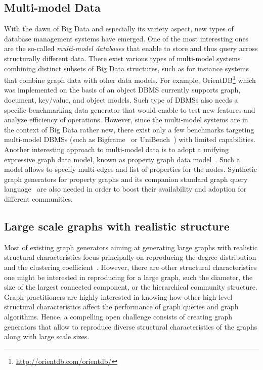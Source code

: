 \subsection{Multi-model Data}
With the dawn of Big Data and especially its variety aspect, new types of
database management systems have emerged. One of the most interesting ones
are the so-called \emph{multi-model databases} that enable to store and
thus
query across structurally different data. There exist various types of
multi-model systems combining  distinct subsets of Big Data structures,
such as for instance systems that combine graph data with other data models.
For example, OrientDB\footnote{\url{http://orientdb.com/orientdb/}} which was
implemented on the basis of an object DBMS currently supports graph, document,
key/value, and object models. Such type of DBMSs also needs a specific
benchmarking data generator that would enable
to test new features and analyze efficiency of operations. However, since the
multi-model systems are in the context of Big Data rather new, there exist only
a few benchmarks targeting multi-model DBMSs (such as
Bigframe~\cite{journals/pvldb/KunjirKB14} or UniBench~\cite{conf/cidr/lu17})
with limited capabilities.
Another interesting approach to multi-model data is to adopt a unifying
expressive graph data model, known as property graph data
model~\cite{BFVY18}. Such a model allows to specify multi-edges and list of
properties for the nodes. Synthetic graph generators for property graphs and its
companion standard graph query language~\cite{Angles18,AnglesABBFGLPPS18} are also needed in order to boost
their availability and adoption for different communities.

\subsection{Large scale graphs with realistic structure}

Most of existing graph generators aiming at generating large graphs with realistic
structural characteristics focus principally on reproducing the degree
distribution and the clustering
coefficient~\cite{kolda2014scalable,edunov2016darwini}. However, there are other
structural characteristics one might be interested in reproducing for a large
graph, such the diameter, the size of the largest connected component, or the
hierarchical community structure. Graph practitioners are highly interested in knowing
how other high-level structural characteristics affect the performance of graph
queries and graph algorithms. Hence, a compelling open challenge consists
of creating
graph generators that allow to reproduce diverse structural characteristics
of the graphs along with large scale sizes.


